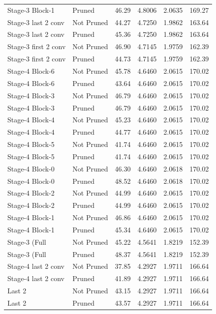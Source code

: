 \begin{table}
\begin{tabular}{llcccc}
Stage-3 Block-1 & Pruned & 46.29 & 4.8006 & 2.0635 & 169.27 \\
Stage-3 last 2 conv & Not Pruned & 44.27 & 4.7250 & 1.9862 & 163.64 \\
Stage-3 last 2 conv & Pruned & 45.36 & 4.7250 & 1.9862 & 163.64 \\
Stage-3 first 2 conv & Not Pruned & 46.90 & 4.7145 & 1.9759 & 162.39 \\
Stage-3 first 2 conv & Pruned & 44.73 & 4.7145 & 1.9759 & 162.39 \\
Stage-4 Block-6 & Not Pruned & 45.78 & 4.6460 & 2.0615 & 170.02 \\
Stage-4 Block-6 & Pruned & 43.64 & 4.6460 & 2.0615 & 170.02 \\
Stage-4 Block-3 & Not Pruned & 46.79 & 4.6460 & 2.0615 & 170.02 \\
Stage-4 Block-3 & Pruned & 46.79 & 4.6460 & 2.0615 & 170.02 \\
Stage-4 Block-4 & Not Pruned & 45.23 & 4.6460 & 2.0615 & 170.02 \\
Stage-4 Block-4 & Pruned & 44.77 & 4.6460 & 2.0615 & 170.02 \\
Stage-4 Block-5 & Not Pruned & 41.74 & 4.6460 & 2.0615 & 170.02 \\
Stage-4 Block-5 & Pruned & 41.74 & 4.6460 & 2.0615 & 170.02 \\
Stage-4 Block-0 & Not Pruned & 46.30 & 4.6460 & 2.0618 & 170.02 \\
Stage-4 Block-0 & Pruned & 48.52 & 4.6460 & 2.0618 & 170.02 \\
Stage-4 Block-2 & Not Pruned & 44.99 & 4.6460 & 2.0615 & 170.02 \\
Stage-4 Block-2 & Pruned & 44.99 & 4.6460 & 2.0615 & 170.02 \\
Stage-4 Block-1 & Not Pruned & 46.86 & 4.6460 & 2.0615 & 170.02 \\
Stage-4 Block-1 & Pruned & 45.34 & 4.6460 & 2.0615 & 170.02 \\
Stage-3 (Full & Not Pruned & 45.22 & 4.5641 & 1.8219 & 152.39 \\
Stage-3 (Full & Pruned & 48.37 & 4.5641 & 1.8219 & 152.39 \\
Stage-4 last 2 conv & Not Pruned & 37.85 & 4.2927 & 1.9711 & 166.64 \\
Stage-4 last 2 conv & Pruned & 41.89 & 4.2927 & 1.9711 & 166.64 \\
Last 2 & Not Pruned & 43.15 & 4.2927 & 1.9711 & 166.64 \\
Last 2 & Pruned & 43.57 & 4.2927 & 1.9711 & 166.64 \\

\end{tabular}
\end{table}
